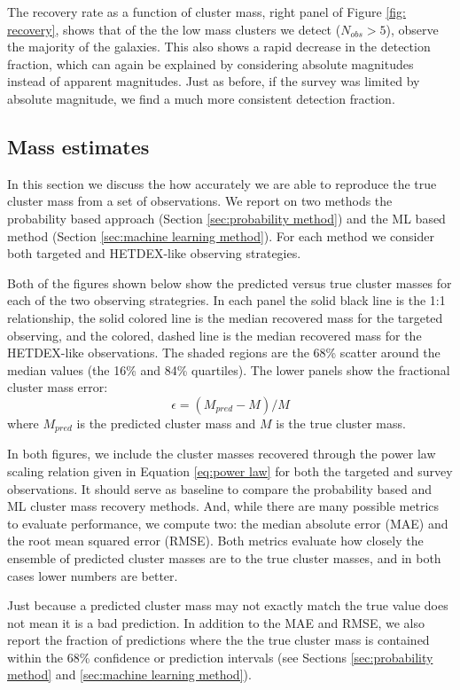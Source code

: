 \documentclass[fleqn,usenatbib]{mnras}
\begin{document}
The recovery rate as a function of cluster mass, right panel of Figure \ref{fig: recovery}, shows that of the the low mass clusters we detect ($N_{obs} >5$), observe the majority of the galaxies. This also shows a rapid decrease in the detection fraction, which can again be explained by considering absolute magnitudes instead of apparent magnitudes. Just as before, if the survey was limited by absolute magnitude, we find a much more consistent detection fraction.

\subsection{Mass estimates}
In this section we discuss the how accurately we are able to reproduce the true cluster mass from a set of observations. We report on two methods the probability based approach (Section \ref{sec:probability method}) and the ML based method (Section \ref{sec:machine learning method}). For each method we consider both targeted and HETDEX-like observing strategies.

Both of the figures shown below show the predicted versus true cluster masses for each of the two observing strategries. In each panel the solid black line is the 1:1 relationship, the solid colored line is the median recovered mass for the targeted observing, and the colored, dashed line is the median recovered mass for the HETDEX-like observations. The shaded regions are the 68\% scatter around the median values (the 16\% and 84\% quartiles). The lower panels show the fractional cluster mass error: 
\begin{equation}\label{eq: fractional error}
	\epsilon = (M_{pred} - M)/M
\end{equation}
where $M_{pred}$ is the predicted cluster mass and $M$ is the true cluster mass.

In both figures, we include the cluster masses recovered through the power law scaling relation given in Equation \ref{eq:power law} for both the targeted and survey observations. It should serve as baseline to compare the probability based and ML cluster mass recovery methods. And, while there are many possible metrics to evaluate performance, we compute two: the median absolute error (MAE) and the root mean squared error (RMSE). Both metrics evaluate how closely the ensemble of predicted cluster masses are to the true cluster masses, and in both cases lower numbers are better.   

Just because a predicted cluster mass may not exactly match the true value does not mean it is a bad prediction. In addition to the MAE and RMSE, we also report the fraction of predictions where the the true cluster mass is contained within the 68\% confidence or prediction intervals (see Sections \ref{sec:probability method} and \ref{sec:machine learning method}). 
\end{document}
